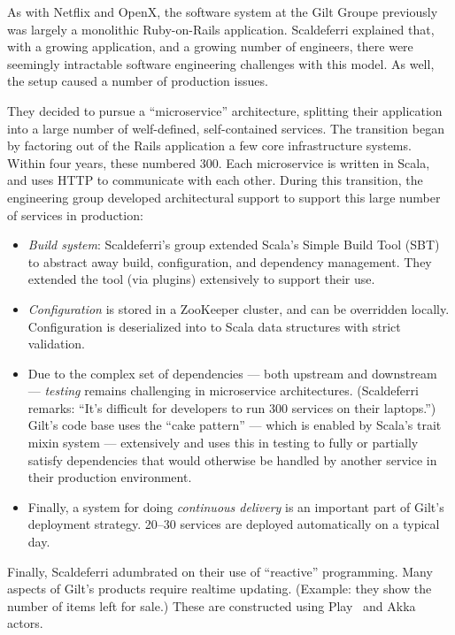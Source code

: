 \documentclass{jfp1}
\begin{document}
As with Netflix and OpenX, the software system at the Gilt Groupe
previously was largely a monolithic Ruby-on-Rails application.
Scaldeferri explained that, with a growing
application, and a growing number of engineers, there were seemingly
intractable software engineering challenges with this model. As well,
the setup caused a number of production issues.

They decided to pursue a ``microservice'' architecture, splitting
their application into a large number of welf-defined, self-contained
services. The transition began by factoring out of the Rails
application a few core infrastructure systems. Within four years,
these numbered 300. Each microservice is written in Scala, and uses
HTTP to communicate with each other. During this transition, the
engineering group developed architectural support to support this
large number of services in production:

\begin{itemize}

\item \textit{Build system}: Scaldeferri's group extended Scala's 
Simple Build Tool (SBT) to abstract away build, configuration, and 
dependency management. They extended the tool (via plugins)
extensively to support their use.

\item \textit{Configuration} is stored in a ZooKeeper cluster, and
can be overridden locally. Configuration is deserialized into to Scala
data structures with strict validation.

\item Due to the complex set of dependencies --- both upstream and
downstream --- \textit{testing} remains challenging in microservice
architectures. (Scaldeferri remarks: ``It's difficult for developers to run 
300 services on their laptops.'') Gilt's code base uses the ``cake pattern'' --- 
which is enabled by Scala's trait mixin system --- extensively and
uses this in testing to fully or partially satisfy dependencies that would
otherwise be handled by another service in their production environment.

\item Finally, a system for doing \textit{continuous delivery} is an
important part of Gilt's deployment strategy. 20--30 services are
deployed automatically on a typical day.

\end{itemize}

Finally, Scaldeferri adumbrated on their use of ``reactive''
programming. Many aspects of Gilt's products require realtime
updating. (Example: they show the number of items left for sale.)
These are constructed using Play~\cite{Typesafe:2014:Play} and
Akka~\cite{Typesafe:2014:Akka} actors.
\end{document}
